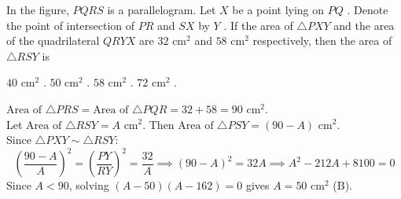 \question In the figure, $PQRS$ is a parallelogram. Let $X$ be a point lying on $PQ$ . Denote the point of intersection of $PR$ and $SX$ by $Y$ . If the area of $\triangle PXY$ and the area of the quadrilateral $QRYX$ are $32\text{ cm}^2$ and $58\text{ cm}^2$ respectively, then the area of $\triangle RSY$ is

\begin{minipage}{0.45\textwidth}
\begin{choices}
    \choice $40\text{ cm}^2$ .
    \correctchoice $50\text{ cm}^2$ .
    \choice $58\text{ cm}^2$ .
    \choice $72\text{ cm}^2$ .
\end{choices}
\end{minipage}
\begin{minipage}{0.52\textwidth}
\centering
{}
\end{minipage}
\begin{solution}
$\text{Area of } \triangle PRS = \text{Area of } \triangle PQR = 32 + 58 = 90\text{ cm}^2$. \\
Let $\text{Area of } \triangle RSY = A\text{ cm}^2$. Then $\text{Area of } \triangle PSY = (90 - A)\text{ cm}^2$. \\
Since $\triangle PXY \sim \triangle RSY$:
\[ \left(\frac{90 - A}{A}\right)^2 = \left(\frac{PY}{RY}\right)^2 = \frac{32}{A} \implies (90 - A)^2 = 32A \implies A^2 - 212A + 8100 = 0 \]
Since $A < 90$, solving $(A - 50)(A - 162) = 0$ gives $A = 50\text{ cm}^2$ (B).
\end{solution}